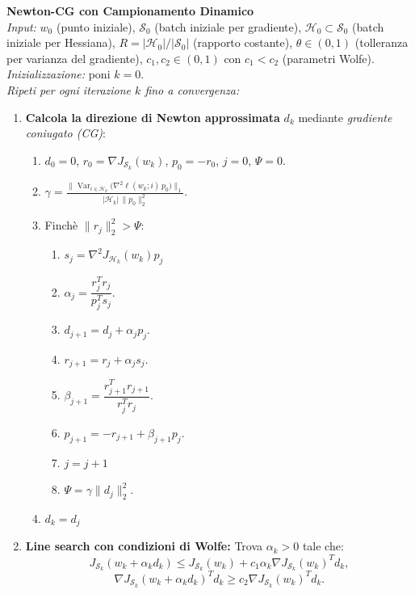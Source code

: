 \documentclass[a4paper,12pt]{article}
\numberwithin{equation}{section}
\numberwithin{figure}{section}
\numberwithin{table}{section}
\begin{document}
\begin{actionbox}
  \textbf{Newton-CG con Campionamento Dinamico}\\[0.3cm]
  \textit{Input:} 
  $w_0$ (punto iniziale), 
  $\mathcal{S}_0$ (batch iniziale per gradiente), 
  $\mathcal{H}_0 \subset \mathcal{S}_0$ (batch iniziale per Hessiana), 
  $R = |\mathcal{H}_0|/|\mathcal{S}_0|$ (rapporto costante), 
  $\theta \in (0,1)$ (tolleranza per varianza del gradiente),
  $c_1, c_2 \in (0,1)$ con $c_1 < c_2$ (parametri Wolfe).\\[0.1cm]
  
  \textit{Inizializzazione:} poni $k = 0$.\\[0.1cm]
  
  \textit{Ripeti per ogni iterazione $k$ fino a convergenza:}
  
  \begin{enumerate}
    \item \textbf{Calcola la direzione di Newton approssimata} $d_k$ mediante \emph{gradiente coniugato (CG)}:
    \begin{enumerate}
      \item $d_0 = 0$, $r_0 = \nabla J_{\mathcal{S}_k}(w_k)$, $p_0 = -r_0$, $j=0$, $\Psi=0$.
      \item $ \gamma = \frac{\| \operatorname{Var}_{i\in\mathcal{H}_k}\bigl(\nabla^2\ell(w_k;i)\,p_0\bigr) \|_1}{|\mathcal{H}_k| \, \|p_0\|_2^2}.
      $
      \item Finchè  $\|r_{j}\|_2^2 > \Psi$:
      \begin{enumerate}
        \item $s_j = \nabla^2 J_{\mathcal{H}_k}(w_k) p_j$
        \item $\alpha_j = \dfrac{r_j^T r_j}{p_j^T s_j}$.
        \item $d_{j+1} = d_j + \alpha_j p_j$.
        \item $r_{j+1} = r_j + \alpha_j s_j$.
        \item $\beta_{j+1} = \dfrac{r_{j+1}^T r_{j+1}}{r_j^T r_j}$.
        \item $p_{j+1} = -r_{j+1} + \beta_{j+1} p_j$.
        \item $j=j+1$
        \item $\Psi = \gamma \|d_{j}\|_2^2$.
        
      \end{enumerate}
      \item $d_k = d_{j}$
    \end{enumerate}
    
    \item \textbf{Line search con condizioni di Wolfe:}
    Trova $\alpha_k > 0$ tale che:
    \[
    J_{\mathcal{S}_k}(w_k + \alpha_k d_k) \le J_{\mathcal{S}_k}(w_k) + c_1 \alpha_k \nabla J_{\mathcal{S}_k}(w_k)^T d_k,
    \]
    \[
    \nabla J_{\mathcal{S}_k}(w_k + \alpha_k d_k)^T d_k \ge c_2 \nabla J_{\mathcal{S}_k}(w_k)^T d_k.
    \]
    

\end{enumerate}
\end{actionbox}
\end{document}
